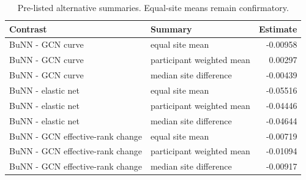 \begin{table}[!t]
\centering
\caption{Pre-listed alternative summaries. Equal-site means remain confirmatory.}
\label{tab:robustness-summaries}
\footnotesize
\begin{tabularx}{\textwidth}{Xlr}
\toprule
Contrast & Summary & Estimate \\
\midrule
BuNN - GCN curve & equal site mean & -0.00958 \\
BuNN - GCN curve & participant weighted mean & 0.00297 \\
BuNN - GCN curve & median site difference & -0.00439 \\
BuNN - elastic net & equal site mean & -0.05516 \\
BuNN - elastic net & participant weighted mean & -0.04446 \\
BuNN - elastic net & median site difference & -0.04644 \\
BuNN - GCN effective-rank change & equal site mean & -0.00719 \\
BuNN - GCN effective-rank change & participant weighted mean & -0.01094 \\
BuNN - GCN effective-rank change & median site difference & -0.00917 \\
\bottomrule
\end{tabularx}
\end{table}
